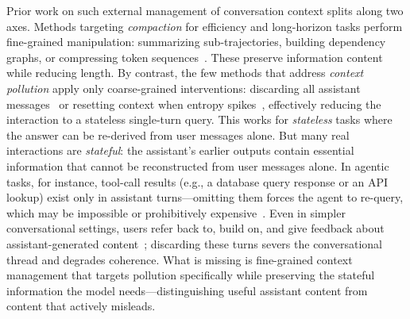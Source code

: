 \documentclass{article} %
\begin{document}
Prior work on such external management of conversation context splits along two axes. Methods targeting \emph{compaction} for efficiency and long-horizon tasks perform fine-grained manipulation: summarizing sub-trajectories, building dependency graphs, or compressing token sequences~\citep{schroeder2025thread,zhang2025rlm,sun2025contextfolding}. These preserve information content while reducing length. By contrast, the few methods that address \emph{context pollution} apply only coarse-grained interventions: discarding all assistant messages~\citep{huang2026context} or resetting context when entropy spikes~\citep{khalid2025ergo}, effectively reducing the interaction to a stateless single-turn query.
This works for \emph{stateless} tasks where the answer can be re-derived from user messages alone.
But many real interactions are \emph{stateful}: the assistant's earlier outputs contain essential information that cannot be reconstructed from user messages alone.
In agentic tasks, for instance, tool-call results (e.g., a database query response or an API lookup) exist only in assistant turns---omitting them forces the agent to re-query, which may be impossible or prohibitively expensive~\citep{barres2025tau2}.
Even in simpler conversational settings, users refer back to, build on, and give feedback about assistant-generated content~\citep{huang2026context}; discarding these turns severs the conversational thread and degrades coherence.
What is missing is fine-grained context management that targets pollution specifically while preserving the stateful information the model needs---distinguishing useful assistant content from content that actively misleads.
\end{document}
